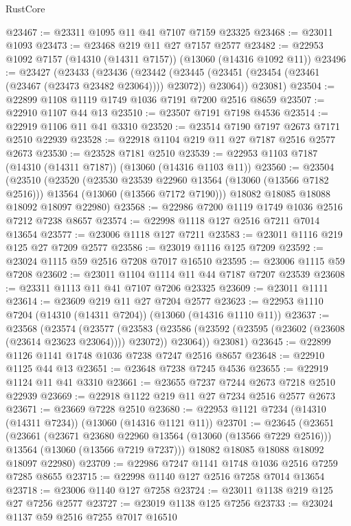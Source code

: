 \begin{lexlean}{RustCore}
\begin{coremodule}
@23467 := @23311 @1095 @11 @41 @7107 @7159 @23325
@23468 := @23011 @1093
@23473 := @23468 @219 @11 @27 @7157 @2577
@23482 := @22953 @1092 @7157 (@14310 (@14311 @7157)) (@13060 (@14316 @1092 @11))
@23496 := @23427
    (@23433
      (@23436
        (@23442 (@23445 (@23451 (@23454 (@23461 (@23467 (@23473 @23482 @23064)))) @23072)) @23064))
      @23081)
@23504 := @22899 @1108 @1119 @1749 @1036 @7191 @7200 @2516 @8659
@23507 := @22910 @1107 @44 @13
@23510 := @23507 @7191 @7198 @4536
@23514 := @22919 @1106 @11 @41 @3310
@23520 := @23514 @7190 @7197 @2673 @7171 @2510 @22939
@23528 := @22918 @1104 @219 @11 @27 @7187 @2516 @2577 @2673
@23530 := @23528 @7181 @2510
@23539 := @22953 @1103 @7187 (@14310 (@14311 @7187)) (@13060 (@14316 @1103 @11))
@23560 := @23504
    (@23510
      (@23520
        (@23530 @23539 @22960 @13564 (@13060 (@13566 @7182 @2516)))
        @13564
        (@13060 (@13566 @7172 @7190)))
      @18082
      @18085
      @18088
      @18092
      @18097
      @22980)
@23568 := @22986 @7200 @1119 @1749 @1036 @2516 @7212 @7238 @8657
@23574 := @22998 @1118 @127 @2516 @7211 @7014 @13654
@23577 := @23006 @1118 @127 @7211
@23583 := @23011 @1116 @219 @125 @27 @7209 @2577
@23586 := @23019 @1116 @125 @7209
@23592 := @23024 @1115 @59 @2516 @7208 @7017 @16510
@23595 := @23006 @1115 @59 @7208
@23602 := @23011 @1104 @1114 @11 @44 @7187 @7207 @23539
@23608 := @23311 @1113 @11 @41 @7107 @7206 @23325
@23609 := @23011 @1111
@23614 := @23609 @219 @11 @27 @7204 @2577
@23623 := @22953 @1110 @7204 (@14310 (@14311 @7204)) (@13060 (@14316 @1110 @11))
@23637 := @23568
    (@23574
      (@23577
        (@23583 (@23586 (@23592 (@23595 (@23602 (@23608 (@23614 @23623 @23064)))) @23072)) @23064))
      @23081)
@23645 := @22899 @1126 @1141 @1748 @1036 @7238 @7247 @2516 @8657
@23648 := @22910 @1125 @44 @13
@23651 := @23648 @7238 @7245 @4536
@23655 := @22919 @1124 @11 @41 @3310
@23661 := @23655 @7237 @7244 @2673 @7218 @2510 @22939
@23669 := @22918 @1122 @219 @11 @27 @7234 @2516 @2577 @2673
@23671 := @23669 @7228 @2510
@23680 := @22953 @1121 @7234 (@14310 (@14311 @7234)) (@13060 (@14316 @1121 @11))
@23701 := @23645
    (@23651
      (@23661
        (@23671 @23680 @22960 @13564 (@13060 (@13566 @7229 @2516)))
        @13564
        (@13060 (@13566 @7219 @7237)))
      @18082
      @18085
      @18088
      @18092
      @18097
      @22980)
@23709 := @22986 @7247 @1141 @1748 @1036 @2516 @7259 @7285 @8655
@23715 := @22998 @1140 @127 @2516 @7258 @7014 @13654
@23718 := @23006 @1140 @127 @7258
@23724 := @23011 @1138 @219 @125 @27 @7256 @2577
@23727 := @23019 @1138 @125 @7256
@23733 := @23024 @1137 @59 @2516 @7255 @7017 @16510

\end{coremodule}
\end{lexlean}

